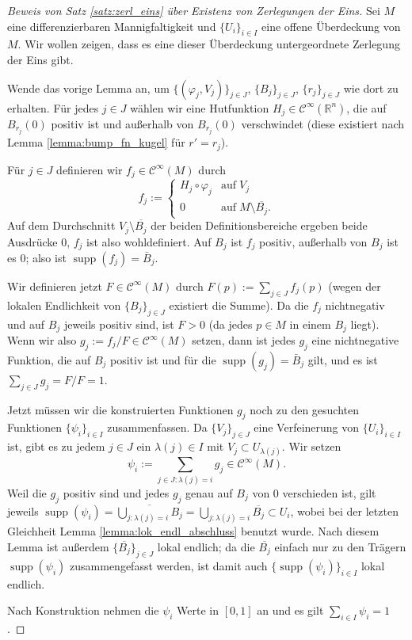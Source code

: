 \documentclass[a4paper]{scrbook}
\numberwithin{equation}{chapter}
\DeclareMathOperator{\supp}{supp}
\newcommand{\R}{\mathbb{R}}
\newcommand{\sC}{\mathcal{C}^{\infty}}
\theoremstyle{definition}
\begin{document}
\begin{proof}[Beweis von Satz \ref{satz:zerl_eins} über Existenz von Zerlegungen der Eins]
	Sei $M$ eine differenzierbaren Mannigfaltigkeit und $\{U_i\}_{i\in I}$ eine offene Überdeckung von $M$. Wir wollen zeigen, dass es eine dieser Überdeckung untergeordnete Zerlegung der Eins gibt.

	Wende das vorige Lemma an, um $\{(\varphi_j,V_j)\}_{j\in J}$, $\{B_j\}_{j\in J}$, $\{r_j\}_{j\in J}$ wie dort zu erhalten. Für jedes $j\in J$ wählen wir eine Hutfunktion $H_j \in \sC(\R^n)$, die auf $B_{r_j}(0)$ positiv ist und außerhalb von $B_{r_j}(0)$ verschwindet (diese existiert nach Lemma \ref{lemma:bump_fn_kugel} für $r' = r_j$).

	Für $j\in J$ definieren wir $f_j \in \sC(M)$ durch
	\[f_j := \begin{cases}
	H_j \circ \varphi_j & \text{auf} \; V_j\\
	0 & \text{auf} \; M \setminus \overline{B_j}.
	\end{cases}\]
	Auf dem Durchschnitt $V_j \setminus \overline{B_j}$ der beiden Definitionsbereiche ergeben beide Ausdrücke 0, $f_j$ ist also wohldefiniert. Auf $B_j$ ist $f_j$ positiv, außerhalb von $B_j$ ist es 0; also ist $\supp(f_j) = \bar B_j$.

	Wir definieren jetzt $F \in \sC(M)$ durch $F(p) := \sum_{j\in J} f_j(p)$ (wegen der lokalen Endlichkeit von $\{B_j\}_{j\in J}$ existiert die Summe). Da die $f_j$ nichtnegativ und auf $B_j$  jeweils positiv sind, ist $F > 0$ (da jedes $p\in M$ in einem $B_j$ liegt). Wenn wir also $g_j := f_j / F \in \sC(M)$ setzen, dann ist jedes $g_j$ eine nichtnegative Funktion, die auf $B_j$ positiv ist und für die $\supp(g_j) = \bar B_j$ gilt, und es ist $\sum_{j \in J} g_j = F/F = 1$.

	Jetzt müssen wir die konstruierten Funktionen $g_j$ noch zu den gesuchten Funktionen $\{\psi_i\}_{i\in I}$ zusammenfassen. Da $\{V_j\}_{j\in J}$ eine Verfeinerung von $\{U_i\}_{i\in I}$ ist, gibt es zu jedem $j \in J$ ein $\lambda(j) \in I$ mit $V_j \subset U_{\lambda(j)}$. Wir setzen
	\[\psi_i := \sum_{j\in J: \lambda(j) = i} g_j \in \sC(M).\]
	Weil die $g_j$ positiv sind und jedes $g_j$ genau auf $B_j$ von 0 verschieden ist, gilt jeweils $\supp(\psi_i) = \overline{\bigcup_{j: \lambda(j) = i} B_j} = \bigcup_{j: \lambda(j) = i} \overline{B_j} \subset U_i$, wobei bei der letzten Gleichheit Lemma \ref{lemma:lok_endl_abschluss} benutzt wurde. Nach diesem Lemma ist außerdem $\{\overline{B_j}\}_{j\in J}$ lokal endlich; da die $\overline{B_j}$ einfach nur zu den Trägern $\supp(\psi_i)$ \glqq zusammengefasst werden\grqq, ist damit auch $\{\supp(\psi_i)\}_{i\in I}$ lokal endlich.

	Nach Konstruktion nehmen die $\psi_i$ Werte in $[0,1]$ an und es gilt $\sum_{i\in I} \psi_i = 1$.
\end{proof}
\end{document}

